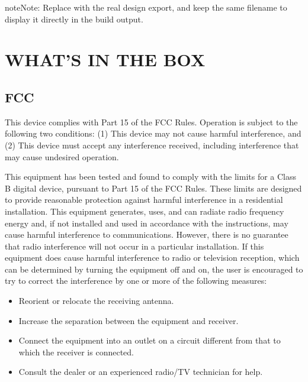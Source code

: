 \documentclass[a4paper,10pt,twoside,openany,english]{sphinxhowto}
\begin{document}
\begin{sphinxadmonition}{note}{Note:}
\sphinxAtStartPar
Replace  with the real design export,
and keep the same filename to display it directly in the build output.
\end{sphinxadmonition}



\section{WHAT’S IN THE BOX}
\label{\detokenize{index:what-s-in-the-box}}

\subsection{FCC}
\label{\detokenize{index:fcc}}
\sphinxAtStartPar
This device complies with Part 15 of the FCC Rules. Operation is subject to the following two conditions:
(1) This device may not cause harmful interference, and
(2) This device must accept any interference received, including interference that may cause undesired operation.

\sphinxAtStartPar
{} This equipment has been tested and found to comply with the limits for a Class B digital device,
pursuant to Part 15 of the FCC Rules.
These limits are designed to provide reasonable protection against harmful interference in a residential
installation. This equipment generates, uses, and can radiate radio frequency energy and, if not installed
and used in accordance with the instructions, may cause harmful interference to communications.
However, there is no guarantee that radio interference will not occur in a particular installation.
If this equipment does cause harmful interference to radio or television reception, which can be
determined by turning the equipment off and on, the user is encouraged to try to correct the interference
by one or more of the following measures:
\begin{itemize}
\item {} 
\sphinxAtStartPar
Reorient or relocate the receiving antenna.

\item {} 
\sphinxAtStartPar
Increase the separation between the equipment and receiver.

\item {} 
\sphinxAtStartPar
Connect the equipment into an outlet on a circuit different from that to which the receiver is connected.

\item {} 
\sphinxAtStartPar
Consult the dealer or an experienced radio/TV technician for help.

\end{itemize}
\end{document}
